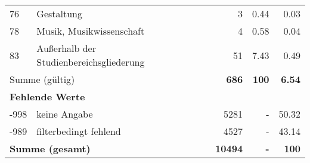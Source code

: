 \begin{longtable}{lXrrr}
        76 & \multicolumn{1}{X}{Gestaltung} & %
          \num{3} &
          \num[round-mode=places,round-precision=2]{0,44} &
          \num[round-mode=places,round-precision=2]{0,03} \\

        78 & \multicolumn{1}{X}{Musik, Musikwissenschaft} & %
          \num{4} &
          \num[round-mode=places,round-precision=2]{0,58} &
          \num[round-mode=places,round-precision=2]{0,04} \\

        83 & \multicolumn{1}{X}{Außerhalb der Studienbereichsgliederung} & %
          \num{51} &
          \num[round-mode=places,round-precision=2]{7,43} &
          \num[round-mode=places,round-precision=2]{0,49} \\

     \midrule
     \multicolumn{2}{l}{Summe (gültig)} &
       \textbf{\num{686}} &
     \textbf{100} &
       \textbf{\num[round-mode=places,round-precision=2]{6,54}} \\
     \multicolumn{5}{l}{\textbf{Fehlende Werte}}\\
       -998 &
       keine Angabe &
         \num{5281} &
        - &
         \num[round-mode=places,round-precision=2]{50,32} \\
       -989 &
       filterbedingt fehlend &
         \num{4527} &
        - &
         \num[round-mode=places,round-precision=2]{43,14} \\
     \midrule
     \multicolumn{2}{l}{\textbf{Summe (gesamt)}} &
          \textbf{\num{10494}} &
        \textbf{-} &
        \textbf{100} \\
     \bottomrule
     \end{longtable}
     
